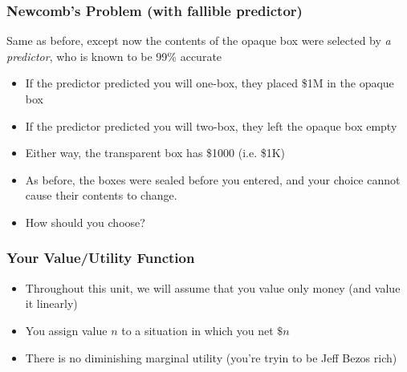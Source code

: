 \begin{frame}
\frametitle{Newcomb's Problem (with fallible predictor)}

Same as before, except now the contents of the opaque box were selected by \emph{a predictor}, who is known to be 99\% accurate

\begin{itemize}[<+->]

\item If the predictor predicted you will one-box, they placed \$1M in the opaque box

\item If the predictor predicted you will two-box, they left the opaque box empty

\item Either way, the transparent box has \$1000 (i.e. \$1K)

\item As before, the boxes were sealed before you entered, and your choice cannot cause their contents to change.

\item How should you choose? 

\end{itemize}
\end{frame}

\begin{frame}
\frametitle{Your Value/Utility Function}

\begin{itemize}[<+->]

\item Throughout this unit, we will assume that you value only money (and value it linearly)

\item You assign value \(n\) to a situation in which you net \(\$n\)

\item There is no diminishing marginal utility (you're tryin to be Jeff Bezos rich)


\end{itemize}
\end{frame}

